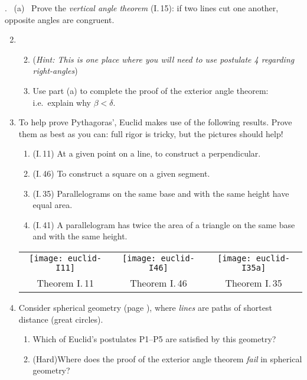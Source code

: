 \begin{exercises}
	\hangindent{}. \ (a) \ Prove the \emph{vertical angle theorem} (I.\,15): if two lines cut one another, opposite angles are congruent.\vspace{-8pt}

	\begin{enumerate}\setcounter{enumi}{1}
	  \item[]\begin{enumerate}\setcounter{enumii}{1}
	    \item[](\emph{Hint: This is one place where you will need to use postulate 4 regarding right-angles})
	    \item Use part (a) to complete the proof of the exterior angle theorem: i.e.\ explain why $\beta<\delta$.
	  \end{enumerate}
	
		\item\label{ex:pythagexs} To help prove Pythagoras', Euclid makes use of the following results. Prove them as best as you can: full rigor is tricky, but the pictures should help!
		\begin{enumerate}
		  \item (I.\,11) At a given point on a line, to construct a perpendicular.
		  \item (I.\,46) To construct a square on a given segment.
		  \item (I.\,35) Parallelograms on the same base and with the same height have equal area.
		  \item (I.\,41) A parallelogram has twice the area of a triangle on the same base and with the same height.
		\end{enumerate}
		
		\begin{center}
			\begin{tabular}{c@{\quad}c@{\quad}c}
				\texttt{[image: euclid-I11]}
				&
				\texttt{[image: euclid-I46]}
				&
				\texttt{[image: euclid-I35a]}
				\\[-2pt]
				Theorem I.\,11
				&
				Theorem I.\,46
				&
				Theorem I.\,35
			\end{tabular}
		\end{center}
		
	  
	  \item Consider spherical geometry (page \pageref{pg:sphere}), where \emph{lines} are paths of shortest distance (great circles).
	 	\begin{enumerate}
	 	  \item Which of Euclid's postulates P1--P5 are satisfied by this geometry?
	  	\item (Hard)\lstsp Where does the proof of the exterior angle theorem \emph{fail} in spherical geometry? 
	 	\end{enumerate}
	  

\end{enumerate}
\end{exercises}

